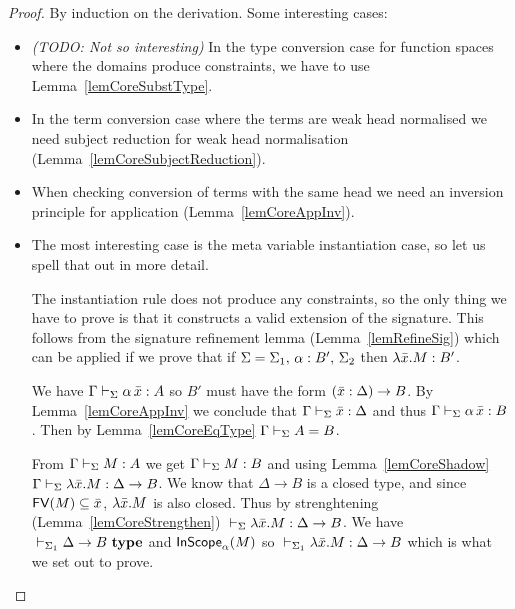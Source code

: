 \begin{proof}
    By induction on the derivation. Some interesting cases:
    \begin{itemize}

	\item {\em (TODO: Not so interesting)} In the type conversion case for
	function spaces where the domains produce constraints, we have to use
	Lemma~\ref{lemCoreSubstType}.

	\item In the term conversion case where the terms are weak head
	normalised we need subject reduction for weak head normalisation
	(Lemma~\ref{lemCoreSubjectReduction}).

	\item When checking conversion of terms with the same head we need an
	inversion principle for application (Lemma~\ref{lemCoreAppInv}).

	\item The most interesting case is the meta variable instantiation
	case, so let us spell that out in more detail.

	The instantiation rule does not produce any constraints, so the only
	thing we have to prove is that it constructs a valid extension of the
	signature. This follows from the signature refinement lemma
	(Lemma~\ref{lemRefineSig}) which can be applied if we prove that if
	$\Sigma = {\Sigma_1},\,{} {{\alpha} : {B'}},\,{} \Sigma_2$ then
	$\lambda \bar x.{} M : {B'}$.

	We have ${\Gamma} \vdash_{\Sigma} {\alpha \, \bar x} : {A}$ so $B'$ must
	have the form $(\bar x:\Delta)\to{} B$. By Lemma~\ref{lemCoreAppInv} we
	conclude that ${\Gamma} \vdash_{\Sigma} {\bar x} : {\Delta}$ and thus
	${\Gamma} \vdash_{\Sigma} {\alpha \, \bar x} : {B}$. Then by
	Lemma~\ref{lemCoreEqType} ${\Gamma} \vdash_{\Sigma}A=B$.

	From ${\Gamma} \vdash_{\Sigma} {M} : {A}$ we get ${\Gamma} \vdash_{\Sigma} {M} : {B}$ and using Lemma~\ref{lemCoreShadow}  ${\Gamma} \vdash_{\Sigma} {\lambda \bar x.{} M} : {\Delta \to B}$. We know that $\Delta \to B$ is a closed
	type, and since $\mathsf{FV}({M}) \subseteq \bar x$, $\lambda \bar x.{} M$ is also
	closed. Thus by strenghtening (Lemma~\ref{lemCoreStrengthen})
	${} \vdash_{\Sigma} {\lambda \bar x.{} M} : {\Delta \to B}$. We have
	${} \vdash_{\Sigma_1}\Delta \to B ~ \mathbf{type}$ and $\mathsf{InScope}_{\alpha}({M})$ so
	${} \vdash_{\Sigma_1} {\lambda \bar x.{} M} : {\Delta \to B}$ which is
	what we set out to prove.


    \end{itemize}
\end{proof}

